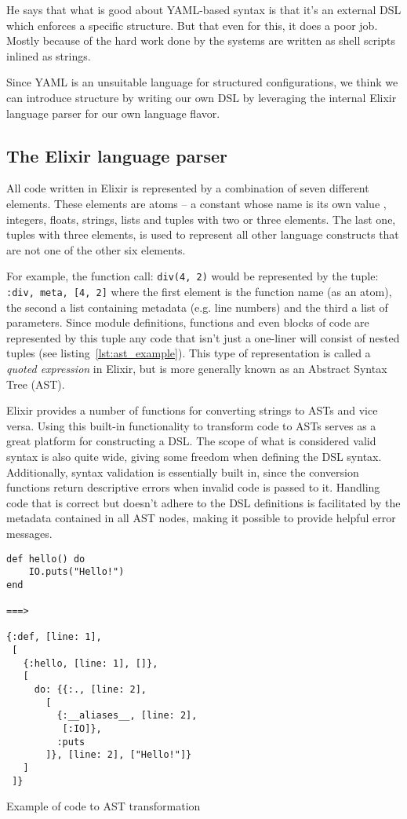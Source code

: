 He says that what is good about YAML-based syntax is that it's an external DSL which enforces a specific structure. But that even for this, it does a poor job. Mostly because of the hard work done by the systems are written as shell scripts inlined as strings.

Since YAML is an unsuitable language for structured configurations, we think we can introduce structure by writing our own DSL by leveraging the internal Elixir language parser for our own language flavor.

\subsection{The Elixir language parser}
All code written in Elixir is represented by a combination of seven different elements. These elements are atoms -- a constant whose name is its own value \citep{2019BasicElixir}, integers, floats, strings, lists and tuples with two or three elements. The last one, tuples with three elements, is used to represent all other language constructs that are not one of the other six elements.

For example, the function call: \texttt{div(4, 2)} would be represented by the tuple: \texttt{{:div, meta, [4, 2]}}
where the first element is the function name (as an atom), the second a list containing metadata (e.g. line numbers) and the third a list of parameters. Since module definitions, functions and even blocks of code are represented by this tuple any code that isn't just a one-liner will consist of nested tuples (see listing~\ref{lst:ast_example}). This type of representation is called a \textit{quoted expression} in Elixir, but is more generally known as an Abstract Syntax Tree (AST).

Elixir provides a number of functions for converting strings to ASTs and vice versa. Using this built-in functionality to transform code to ASTs serves as a great platform for constructing a DSL. The scope of what is considered valid syntax is also quite wide, giving some freedom when defining the DSL syntax. Additionally, syntax validation is essentially built in, since the conversion functions return descriptive errors when invalid code is passed to it. Handling code that is correct but doesn't adhere to the DSL definitions is facilitated by the metadata contained in all AST nodes, making it possible to provide helpful error messages.  

\begin{listing}
\begin{verbatim}
def hello() do
    IO.puts("Hello!")
end

===>

{:def, [line: 1],
 [
   {:hello, [line: 1], []},
   [
     do: {{:., [line: 2],
       [
         {:__aliases__, [line: 2],
          [:IO]},
         :puts
       ]}, [line: 2], ["Hello!"]}
   ]
 ]}
\end{verbatim}
\caption{Example of code to AST transformation}
\label{lst:ast_example}
\end{listing}

